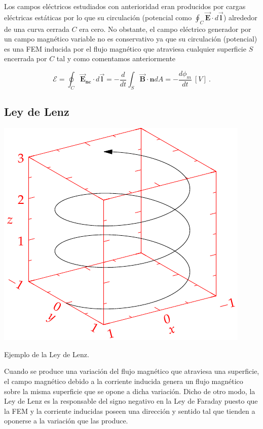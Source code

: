 \documentclass{tufte-handout}
\begin{document}
Los campos eléctricos estudiados con anterioridad eran producidos por cargas eléctricas estáticas por lo que su circulación (potencial como $\oint_{C}\mathbf{\vec{E}}\cdot d\mathbf{\vec{l}}$) alrededor de una curva cerrada $C$ era cero. No obstante, el campo eléctrico generador por un campo magnético variable no es conservativo ya que su circulación (potencial) es una FEM inducida por el flujo magnético que atraviesa cualquier superficie $S$ encerrada por $C$ tal y como comentamos anteriormente

\begin{equation}
\mathcal{E} = \oint_{C}\mathbf{\vec{E}_{nc}}\cdot d \mathbf{\vec{l}} = -\displaystyle\frac{d}{dt}\int_{S}\mathbf{\vec{B}}\cdot\mathbf{\hat{n}}dA = -\displaystyle\frac{d\phi_m}{dt}~[V]~.
\end{equation}

\subsection{Ley de Lenz}

\begin{marginfigure}%
    \includegraphics[width=\linewidth]{helix}
    \caption{Ejemplo de la Ley de Lenz.}
    \label{fig:ejemplolenz}
\end{marginfigure}

Cuando se produce una variación del flujo magnético que atraviesa una superficie, el campo magnético debido a la corriente inducida genera un flujo magnético sobre la misma superficie que se opone a dicha variación. Dicho de otro modo, la Ley de Lenz es la responsable del signo negativo en la Ley de Faraday puesto que la FEM y la corriente inducidas poseen una dirección y sentido tal que tienden a oponerse a la variación que las produce.
\end{document}
